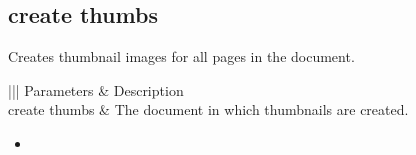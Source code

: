 \documentclass[letterpaper,12pt,english,openany,oneside]{sphinxmanual}
\begin{document}
\begin{sphinxVerbatim}[commandchars=\\\{\}]
 
\end{sphinxVerbatim}




\subsection{create thumbs}
\label{\detokenize{IAC_API_AppleEvtObjects:create-thumbs}}
Creates thumbnail images for all pages in the document.

\label{\detokenize{IAC_API_AppleEvtObjects:syntax-16}}

\begin{sphinxVerbatim}[commandchars=\\\{\}]
 
 \PYG{p}{[}\PYG{p}{]}
\end{sphinxVerbatim}
\label{\detokenize{IAC_API_AppleEvtObjects:parameters-16}}


\begin{savenotes}\sphinxattablestart
\centering
{}\label{\detokenize{IAC_API_AppleEvtObjects:section-31}}\nobreak
\begin{tabular}[t]{|||}
\hline
\sphinxstyletheadfamily 
Parameters
&\sphinxstyletheadfamily 
Description
\\
\hline
create thumbs
&
The document in which thumbnails are created.
\\
\hline
\end{tabular}
\par
\sphinxattableend\end{savenotes}
\label{\detokenize{IAC_API_AppleEvtObjects:related-events-8}}
\begin{itemize}
\item {} 

\end{itemize}
\label{\detokenize{IAC_API_AppleEvtObjects:applescript-example-12}}

\begin{sphinxVerbatim}[commandchars=\\\{\}]
   
\end{sphinxVerbatim}
\label{\detokenize{IAC_API_AppleEvtObjects:apple-event-id-3}}
\end{document}
